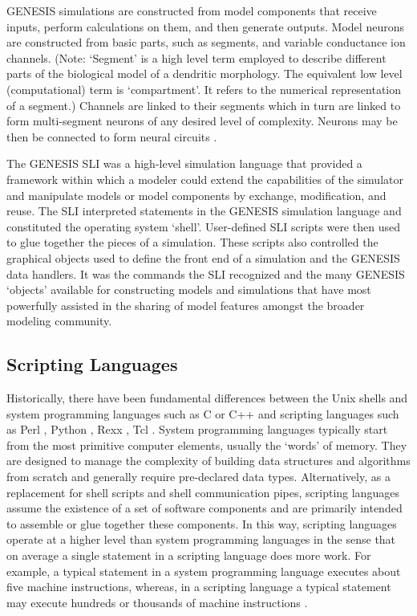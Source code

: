 \documentclass[10pt]{article}
\begin{document}
GENESIS simulations are constructed from model components that receive
inputs, perform calculations on them, and then generate outputs. Model
neurons are constructed from basic parts, such as segments, and
variable conductance ion channels. (Note: `Segment' is a high level term employed to describe different parts of the biological model of a dendritic morphology. The equivalent low level (computational) term is `compartment'. It refers to the numerical representation of a segment.) Channels are linked to their
segments which in turn are linked to form
multi-segment neurons of any desired level of complexity.
Neurons may be then be connected to form neural circuits \cite{bower98:_book_genes}. 

The GENESIS SLI was a high-level simulation language that provided a
framework within which a modeler could extend the capabilities of the
simulator and manipulate models or model components by exchange,
modification, and reuse. The SLI interpreted statements in the GENESIS
simulation language and constituted the operating system `shell'.
User-defined SLI scripts were then used to glue together the pieces of
a simulation. These scripts also controlled the graphical objects used
to define the front end of a simulation and the GENESIS data handlers.
It was the commands the SLI recognized and the many GENESIS `objects'
available for constructing models and simulations that have most powerfully
assisted in the sharing of model features amongst the broader modeling
community.

\subsection*{Scripting Languages}

Historically, there have been fundamental differences between the Unix
shells and system programming languages such as C or C++ and scripting
languages such as Perl \cite{wall99:_perl_progr_refer_guide},
Python \cite{martelli06:_python_nutsh},
Rexx \cite{ohara88:_moder_progr_using_rexx},
Tcl \cite{ousterhout94:_tcl_tk_toolk}.  System
programming languages typically start from the most primitive computer
elements, usually the `words' of memory. They are designed to manage
the complexity of building data structures and algorithms from scratch
and generally require pre-declared data types.  Alternatively, as a
replacement for shell scripts and shell communication pipes, scripting
languages assume the existence of a set of software components and are
primarily intended to assemble or glue together these components.
In this way, scripting languages operate at a higher level than system
programming languages in the sense that on average a single statement
in a scripting language does more work.  For example, a typical statement in a system
programming language executes about five machine instructions, whereas,
in a scripting language a typical statement may execute hundreds or thousands of machine instructions \cite{ousterhout98:_scrip}.
\end{document}
